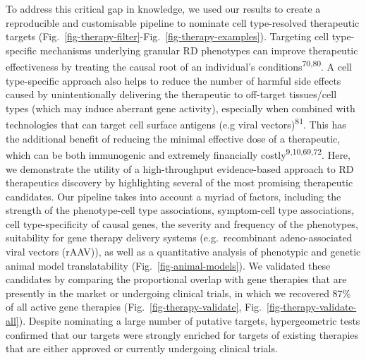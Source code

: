 \documentclass[
]{article}
\begin{document}
To address this critical gap in knowledge, we used our results to create
a reproducible and customisable pipeline to nominate cell type-resolved
therapeutic targets
(Fig.~\ref{fig-therapy-filter}-Fig.~\ref{fig-therapy-examples}).
Targeting cell type-specific mechanisms underlying granular RD
phenotypes can improve therapeutic effectiveness by treating the causal
root of an individual's conditions\textsuperscript{70,80}. A cell
type-specific approach also helps to reduce the number of harmful side
effects caused by unintentionally delivering the therapeutic to
off-target tissues/cell types (which may induce aberrant gene activity),
especially when combined with technologies that can target cell surface
antigens (e.g viral vectors)\textsuperscript{81}. This has the
additional benefit of reducing the minimal effective dose of a
therapeutic, which can be both immunogenic and extremely financially
costly\textsuperscript{9,10,69,72}. Here, we demonstrate the utility of
a high-throughput evidence-based approach to RD therapeutics discovery
by highlighting several of the most promising therapeutic candidates.
Our pipeline takes into account a myriad of factors, including the
strength of the phenotype-cell type associations, symptom-cell type
associations, cell type-specificity of causal genes, the severity and
frequency of the phenotypes, suitability for gene therapy delivery
systems (e.g.~recombinant adeno-associated viral vectors (rAAV)), as
well as a quantitative analysis of phenotypic and genetic animal model
translatability (Fig.~\ref{fig-animal-models}). We validated these
candidates by comparing the proportional overlap with gene therapies
that are presently in the market or undergoing clinical trials, in which
we recovered \(87\)\% of all active gene therapies
(Fig.~\ref{fig-therapy-validate}, Fig.~\ref{fig-therapy-validate-all}).
Despite nominating a large number of putative targets, hypergeometric
tests confirmed that our targets were strongly enriched for targets of
existing therapies that are either approved or currently undergoing
clinical trials.
\end{document}
